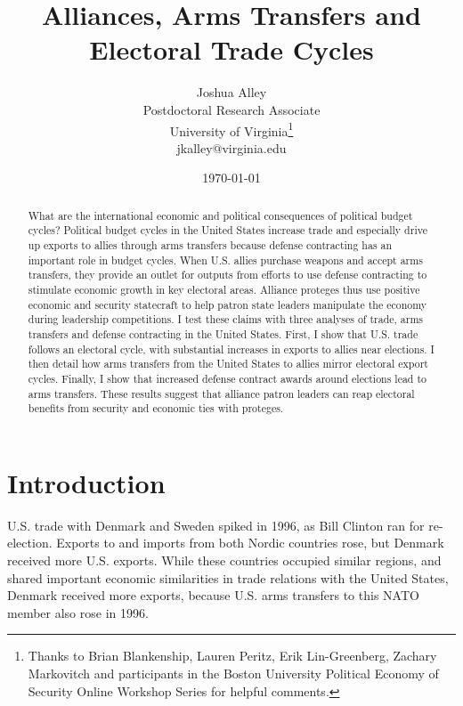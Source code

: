 \documentclass[12pt]{article}
\title{\textbf{Alliances, Arms Transfers and Electoral Trade Cycles}}
\author{Joshua Alley \\
Postdoctoral Research Associate \\
University of Virginia\thanks{Thanks to Brian Blankenship, Lauren Peritz, Erik Lin-Greenberg, Zachary Markovitch and participants in the Boston University Political Economy of Security Online Workshop Series for helpful comments.} \\
jkalley@virginia.edu
}
\date{\today}
\begin{document}
\maketitle 

\begin{abstract}
What are the international economic and political consequences of political budget cycles? 
Political budget cycles in the United States increase trade and especially drive up exports to allies through arms transfers because defense contracting has an important role in budget cycles. 
When U.S. allies purchase weapons and accept arms transfers, they provide an outlet for outputs from efforts to use defense contracting to stimulate economic growth in key electoral areas.
Alliance proteges thus use positive economic and security statecraft to help patron state leaders manipulate the economy during leadership competitions.  
I test these claims with three analyses of trade, arms transfers and defense contracting in the United States. 
First, I show that U.S. trade follows an electoral cycle, with substantial increases in exports to allies near elections.
I then detail how arms transfers from the United States to allies mirror electoral export cycles. 
Finally, I show that increased defense contract awards around elections lead to arms transfers.
These results suggest that alliance patron leaders can reap electoral benefits from security and economic ties with proteges. 
\end{abstract} 


\newpage 
\doublespace 


\section{Introduction}


U.S. trade with Denmark and Sweden spiked in 1996, as Bill Clinton ran for re-election.
Exports to and imports from both Nordic countries rose, but Denmark received more U.S. exports.
While these countries occupied similar regions, and shared important economic similarities in trade relations with the United States, Denmark received more exports, because U.S. arms transfers to this NATO member also rose in 1996.
\end{document}
